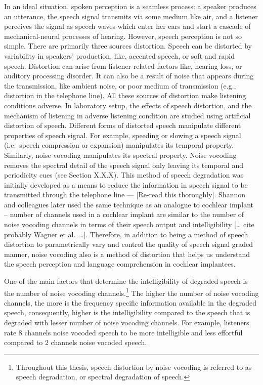 \documentclass[a4paper, nobind]{templates/ociamthesis}
\begin{document}
In an ideal situation, spoken perception is a seamless process: a speaker produces an utterance, the speech signal transmits via some medium like air, and a listener perceives the signal as speech waves which enter her ears and start a cascade of mechanical-neural processes of hearing.
However, speech perception is not so simple.
There are primarily three sources distortion.
Speech can be distorted by variability in speakers' production, like, accented speech, or soft and rapid speech.
Distortion can arise from listener-related factors like, hearing loss, or auditory processing disorder.
It can also be a result of noise that appears during the transmission, like ambient noise, or poor medium of transmission (e.g., distortion in the telephone line).
All these sources of distortion make listening conditions adverse.
In laboratory setup, the effects of speech distortion, and the mechanism of listening in adverse listening condition are studied using artificial distortion of speech.
Different forms of distorted speech manipulate different properties of speech signal.
For example, speeding or slowing a speech signal (i.e.~speech compression or expansion) manipulates its temporal property.
Similarly, noise vocoding manipulates its spectral property.
Noise vocoding removes the spectral detail of the speech signal only leaving its temporal and periodicity cues (see Section X.X.X).
This method of speech degradation was initially developed as a means to reduce the information in speech signal to be transmitted through the telephone line \autocite{Dudley1939,Vocoder1940} --- {[}Re-read this thoroughly{]}.
Shannon and colleagues later used the same technique as an analogue to cochlear implant \autocite{Shannon1995,Loizou1999,Shannon2004} -- number of channels used in a cochlear implant are similar to the number of noise vocoding channels in terms of their speech output and intelligibility {[}\ldots{} cite probably Wagner et al.~\ldots{]}.
Therefore, in addition to being a method of speech distortion to parametrically vary and control the quality of speech signal graded manner, noise vocoding also is a method of distortion that helps us understand the speech perception and language comprehension in cochlear implantees.

One of the main factors that determine the intelligibility of degraded speech is the number of noise vocoding channels.\footnote{Throughout this thesis, speech distortion by noise vocoding is referred to as speech degradation, or spectral degradation of speech.}
The higher the number of noise vocoding channels, the more is the frequency specific information available in the degraded speech,
consequently, higher is the intelligibility compared to the speech that is degraded with lesser number of noise vocoding channels.
For example, listeners rate 8 channels noise vocoded speech to be more intelligible and less effortful compared to 2 channels noise vocoded speech.
\end{document}
